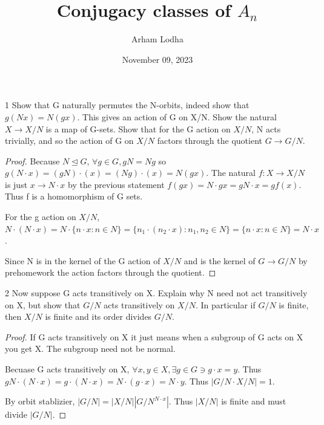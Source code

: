 \documentclass{article}
\begin{document}
\title{Conjugacy classes of $A_n$}
\author{Arham Lodha}%
\date{November 09, 2023}%
\maketitle

\begin{PROB}{1}\label{Problem 1.}
    Show that G naturally permutes the N-orbits, indeed show that $g(Nx) = N(gx)$. This gives an action of G on X/N. Show the natural $X \to X/N$ is a map of G-sets. Show that for the G action on $X/N$, N acts trivially, and so the action of G on $X/N$ factors through the quotient $G \to G/N$. 
\end{PROB}
\begin{proof}
    Because $N \trianglelefteq G$, $\forall g \in G, gN = Ng$ so $g(N \cdot x) = (gN) \cdot (x) = (Ng) \cdot (x) = N(gx)$. The natural $f: X \to X/N$ is just $x \to N \cdot x$ by the previous statement $f(gx) = N \cdot gx = gN \cdot x = gf(x)$. Thus f is a homomorphism of G sets. 

    For the g action on $X/N$, $N \cdot (N \cdot x) = N \cdot \{n \cdot x : n \in N\} = \{n_1 \cdot (n_2 \cdot x) : n_1, n_2 \in N\} = \{n \cdot x : n \in N\} = N \cdot x$.

    Since N is in the kernel of the G action of $X/N$ and is the kernel of $G \to G/N$ by prehomework the action factors through the quotient. 
\end{proof}

\bigskip

\begin{PROB}{2}\label{Problem 2.}
    Now suppose G acts transitively on X. Explain why N need not act transitively on X, but show that $G/N$ acts transitively on $X/N$. In particular if $G/N$ is finite, then $X/N$ is finite and its order divides $G/N$. 
\end{PROB}
\begin{proof}
    If G acts transitively on X it just means when a subgroup of G acts on X you get X. The subgroup need not be normal.

    Becuase G acts transitively on X, $\forall x, y \in X, \exists g \in G \ni g \cdot x = y$. Thus $gN \cdot (N \cdot x) = g \cdot (N \cdot x) = N \cdot (g \cdot x) = N \cdot y$. Thus $|G/N \cdot X/N| = 1$.

    By orbit stablizier, $|G/N| = |X/N||G/N^{N\cdot x}|$. Thus $|X/N|$ is finite and must divide $|G/N|$.
\end{proof}
\end{document}
